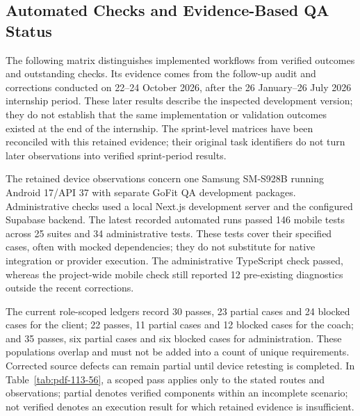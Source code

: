 \documentclass[12pt,a4paper,openany]{report}
\begin{document}
\subsection{Automated Checks and Evidence-Based QA Status}
\label{sec:qa-evidence}

The following matrix distinguishes implemented workflows from verified outcomes and outstanding checks. Its evidence comes from the follow-up audit and corrections conducted on 22--24 October 2026, after the 26 January--26 July 2026 internship period. These later results describe the inspected development version; they do not establish that the same implementation or validation outcomes existed at the end of the internship. The sprint-level matrices have been reconciled with this retained evidence; their original task identifiers do not turn later observations into verified sprint-period results.

The retained device observations concern one Samsung SM-S928B running Android 17/API 37 with separate GoFit QA development packages. Administrative checks used a local Next.js development server and the configured Supabase backend. The latest recorded automated runs passed 146 mobile tests across 25 suites and 34 administrative tests. These tests cover their specified cases, often with mocked dependencies; they do not substitute for native integration or provider execution. The administrative TypeScript check passed, whereas the project-wide mobile check still reported 12 pre-existing diagnostics outside the recent corrections.

The current role-scoped ledgers record 30 passes, 23 partial cases and 24 blocked cases for the client; 22 passes, 11 partial cases and 12 blocked cases for the coach; and 35 passes, six partial cases and six blocked cases for administration. These populations overlap and must not be added into a count of unique requirements. Corrected source defects can remain partial until device retesting is completed. In Table~\ref{tab:pdf-113-56}, a scoped pass applies only to the stated routes and observations; partial denotes verified components within an incomplete scenario; not verified denotes an execution result for which retained evidence is insufficient.
\end{document}
